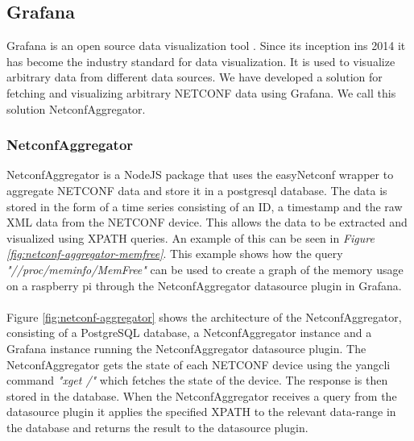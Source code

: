 \documentclass[12pt]{article}
\begin{document}
\newpage

\subsection{Grafana}
Grafana is an open source data visualization tool \cite{GrafanaOpenComposable}. Since its inception ins 2014 it has become the industry standard
for data visualization. It is used to visualize arbitrary data from different data sources.
We have developed a solution for fetching and visualizing arbitrary NETCONF data using Grafana.
We call this solution NetconfAggregator.

\subsubsection{NetconfAggregator}
NetconfAggregator is a NodeJS package that uses the easyNetconf wrapper 
\cite{heimonenSlenderman00Netconfaggregator2025} to aggregate NETCONF data and store 
it in a postgresql database. The data is stored in the form of a time series consisting of an ID, a timestamp and the 
raw XML data from the NETCONF device. This allows the data to be extracted and visualized using XPATH queries.
An example of this can be seen in \textit{Figure \ref{fig:netconf-aggregator-memfree}}.
This example shows how the query \textit{"//proc/meminfo/MemFree"} can be used to create a graph of the memory usage 
on a raspberry pi through the NetconfAggregator datasource plugin in Grafana.
\\
\\
Figure \ref{fig:netconf-aggregator} shows the architecture of the NetconfAggregator, consisting
of a PostgreSQL database, a NetconfAggregator instance and a Grafana instance running the NetconfAggregator datasource plugin.
The NetconfAggregator gets the state of each NETCONF device using the yangcli command \textit{"xget /"} which
fetches the state of the device. The response is then stored in the database.
When the NetconfAggregator receives a query from the datasource plugin it applies the specified XPATH to 
the relevant data-range in the database and returns the result to the datasource plugin.
\end{document}
